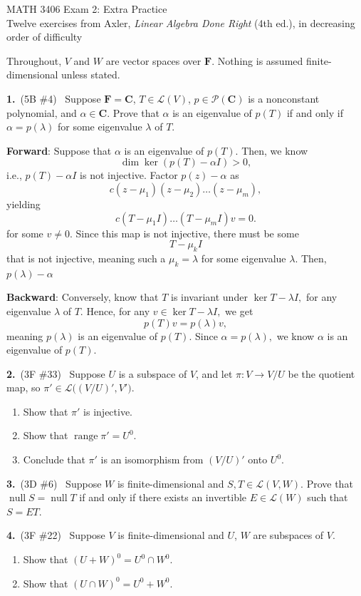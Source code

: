 \documentclass[11pt]{article}
\DeclareMathOperator{\nul}{null}
\DeclareMathOperator{\range}{range}
\newcommand{\F}{\mathbf{F}}
\newcommand{\C}{\mathbf{C}}
\newcommand{\LL}{\mathcal{L}}
\newcommand{\prob}[2]{\medskip\noindent\textbf{#1.}\ \textnormal{(#2)}\ }
\begin{document}
\begin{center}
  {\Large MATH 3406 Exam 2: Extra Practice}\\[4pt]
  {\small Twelve exercises from Axler, \emph{Linear Algebra Done
  Right} (4th ed.), in decreasing order of difficulty}
\end{center}

Throughout, $V$ and $W$ are vector spaces over $\F$. Nothing is
assumed finite-dimensional unless stated.

\prob{1}{5B \#4} Suppose $\F=\C$, $T\in\LL(V)$, $p\in\mathcal{P}(\C)$
is a nonconstant polynomial, and $\alpha\in\C$. Prove that $\alpha$
is an eigenvalue of $p(T)$ if and only if $\alpha=p(\lambda)$ for
some eigenvalue $\lambda$ of $T$.

\textbf{Forward}: Suppose that $\alpha$ is an eigenvalue of $p(T).$
Then, we know
$$
\dim \ker (p(T) - \alpha I) > 0,
$$
i.e., $p(T) - \alpha I$ is not injective. Factor $p(z) - \alpha$ as
$$
c(z - \mu_1)(z - \mu_2) \ldots (z - \mu_m),
$$
yielding
$$
c(T- \mu_1 I ) \ldots (T - \mu_m I ) v = 0.
$$
for some $v \neq 0.$ Since this map is not injective, there must be some
$$
T - \mu_k I
$$
that is not injective, meaning such a $\mu_k = \lambda$ for some
eigenvalue $\lambda.$ Then, $p(\lambda) - \alpha$

\textbf{Backward}: Conversely, know that $T$ is invariant under $\ker
T - \lambda I,$ for any eigenvalue $\lambda$ of $T.$ Hence, for any
$v \in \ker T - \lambda I,$ we get
$$
p(T) v = p(\lambda) v,
$$
meaning $p(\lambda)$ is an eigenvalue of $p(T).$ Since $\alpha =
p(\lambda),$ we know $\alpha$ is an eigenvalue of $p(T).$

\prob{2}{3F \#33} Suppose $U$ is a subspace of $V$, and let
$\pi\colon V\to V/U$ be the quotient map, so $\pi'\in\LL\bigl((V/U)',V'\bigr)$.
\begin{enumerate}[label=(\alph*),topsep=2pt,itemsep=0pt]
  \item Show that $\pi'$ is injective.
  \item Show that $\range \pi'=U^0$.
  \item Conclude that $\pi'$ is an isomorphism from $(V/U)'$ onto $U^0$.
\end{enumerate}

\prob{3}{3D \#6} Suppose $W$ is finite-dimensional and
$S,T\in\LL(V,W)$. Prove that $\nul S=\nul T$ if and only if there
exists an invertible $E\in\LL(W)$ such that $S=ET$.

\prob{4}{3F \#22} Suppose $V$ is finite-dimensional and $U$, $W$ are
subspaces of $V$.
\begin{enumerate}[label=(\alph*),topsep=2pt,itemsep=0pt]
  \item Show that $(U+W)^0=U^0\cap W^0$.
  \item Show that $(U\cap W)^0=U^0+W^0$.
\end{enumerate}
\end{document}
